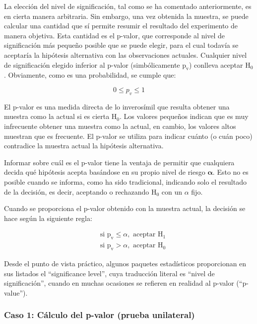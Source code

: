 \documentclass[
]{article}
\begin{document}
La elección del nivel de significación, tal como se ha comentado anteriormente, es en cierta manera arbitraria. Sin embargo, una vez obtenida la muestra, se puede calcular una cantidad que sí permite resumir el resultado del experimento de manera objetiva. Esta cantidad es el p-valor, que corresponde al nivel de significación más pequeño posible que se puede elegir, para el cual todavía se aceptaría la hipótesis alternativa con las observaciones actuales. Cualquier nivel de significación elegido inferior al p-valor (simbólicamente \(\mathrm{p}_{\mathrm{v}}\)) conlleva aceptar \(\mathrm{H}_{0}\). Obviamente, como es una probabilidad, se cumple que:

\[
0 \leq p_{v} \leq 1
\]

El p-valor es una medida directa de lo inverosímil que resulta obtener una muestra como la actual si es cierta \(\mathrm{H}_{0}\). Los valores pequeños indican que es muy infrecuente obtener una muestra como la actual, en cambio, los valores altos muestran que es frecuente. El p-valor se utiliza para indicar cuánto (o cuán poco) contradice la muestra actual la hipótesis alternativa.

Informar sobre cuál es el p-valor tiene la ventaja de permitir que cualquiera decida qué hipótesis acepta basándose en su propio nivel de riesgo \(\boldsymbol{\alpha}\). Esto no es posible cuando se informa, como ha sido tradicional, indicando solo el resultado de la decisión, es decir, aceptando o rechazando \(\mathrm{H}_{0}\) con un \(\alpha\) fijo.

Cuando se proporciona el p-valor obtenido con la muestra actual, la decisión se hace según la siguiente regla:

\[
\begin{aligned}
& \text { si } \mathrm{p}_{\mathrm{v}} \leq \alpha, \text { aceptar } \mathrm{H}_{1} \\
& \text { si } \mathrm{p}_{\mathrm{v}}>\alpha, \text { aceptar } \mathrm{H}_{0}
\end{aligned}
\]

Desde el punto de vista práctico, algunos paquetes estadísticos proporcionan en sus listados el ``significance level'', cuya traducción literal es ``nivel de significación'', cuando en muchas ocasiones se refieren en realidad al p-valor (``p-value'').

\subsubsection{Caso 1: Cálculo del p-valor (prueba unilateral)}\label{caso-1-cuxe1lculo-del-p-valor-prueba-unilateral}
\end{document}
